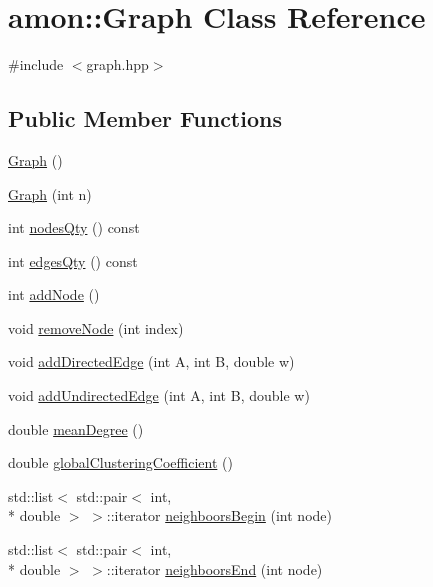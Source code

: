 \hypertarget{classamon_1_1_graph}{\section{amon\-:\-:Graph Class Reference}
\label{classamon_1_1_graph}
}


{\ttfamily \#include $<$graph.\-hpp$>$}

\subsection*{Public Member Functions}
\begin{DoxyCompactItemize}
\item 
\hyperlink{classamon_1_1_graph_a8dbd046ce57a0c624c7abe573b174ce1}{Graph} ()
\item 
\hyperlink{classamon_1_1_graph_a40dd78be5732f86fa3df8d687d0e5728}{Graph} (int n)
\item 
int \hyperlink{classamon_1_1_graph_a7c7ef2759921bb87aa8c69c28ea62f8f}{nodes\-Qty} () const 
\item 
int \hyperlink{classamon_1_1_graph_a705be004387c64a5ce5aa668b0c4e9d7}{edges\-Qty} () const 
\item 
int \hyperlink{classamon_1_1_graph_aa7f39dcf5b2fab62d0b9399bc759ff27}{add\-Node} ()
\item 
void \hyperlink{classamon_1_1_graph_af3a842a93c90db66a7f301c685e51b3a}{remove\-Node} (int index)
\item 
void \hyperlink{classamon_1_1_graph_a02016704b31a4bf3a277fb4fcb8c1d72}{add\-Directed\-Edge} (int A, int B, double w)
\item 
void \hyperlink{classamon_1_1_graph_a98b71efc14d469813b8d1c679ca22fa3}{add\-Undirected\-Edge} (int A, int B, double w)
\item 
double \hyperlink{classamon_1_1_graph_ac97e95d56f333fa63755458cc9443cc6}{mean\-Degree} ()
\item 
double \hyperlink{classamon_1_1_graph_a6e9098ead3849a382e3a5d1949599947}{global\-Clustering\-Coefficient} ()
\item 
std\-::list$<$ std\-::pair$<$ int, \\*
double $>$ $>$\-::iterator \hyperlink{classamon_1_1_graph_a182d3611b27058fda589269589b62b41}{neighboors\-Begin} (int node)
\item 
std\-::list$<$ std\-::pair$<$ int, \\*
double $>$ $>$\-::iterator \hyperlink{classamon_1_1_graph_acaeb02df5f8d9bd71cf4aae11e89532f}{neighboors\-End} (int node)

\end{DoxyCompactItemize}
